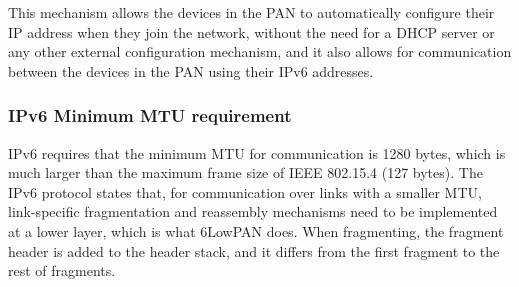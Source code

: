 This mechanism allows the devices in the PAN to automatically configure their IP address when they join the network, without the need for a DHCP server or any other external configuration mechanism, and it also allows for communication between the devices in the PAN using their IPv6 addresses.

\subsubsection{IPv6 Minimum MTU requirement}

IPv6 requires that the minimum MTU for communication is 1280 bytes, which is much larger than the maximum frame size of IEEE 802.15.4 (127 bytes). The IPv6 protocol states that, for communication over links with a smaller MTU, link-specific fragmentation and reassembly mechanisms need to be implemented at a lower layer, which is what 6LowPAN does. When fragmenting, the fragment header is added to the header stack, and it differs from the first fragment to the rest of fragments.

